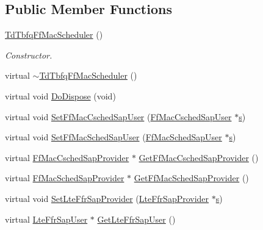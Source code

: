 \subsection*{Public Member Functions}
\begin{DoxyCompactItemize}
\item 
\hyperlink{classns3_1_1TdTbfqFfMacScheduler_ae3122288024d362f6257689e8f1cb55f}{Td\+Tbfq\+Ff\+Mac\+Scheduler} ()
\begin{DoxyCompactList}\small\item\em Constructor. \end{DoxyCompactList}\item 
virtual \hyperlink{classns3_1_1TdTbfqFfMacScheduler_ad0af9fb4be53e098cc3f7ee81c39d1d4}{$\sim$\+Td\+Tbfq\+Ff\+Mac\+Scheduler} ()
\item 
virtual void \hyperlink{classns3_1_1TdTbfqFfMacScheduler_a2e3ba63463ee06a7fca95def5363be8b}{Do\+Dispose} (void)
\item 
virtual void \hyperlink{classns3_1_1TdTbfqFfMacScheduler_a3bffc6c77357e4f27ae1e991e82c3d85}{Set\+Ff\+Mac\+Csched\+Sap\+User} (\hyperlink{classns3_1_1FfMacCschedSapUser}{Ff\+Mac\+Csched\+Sap\+User} $\ast$\hyperlink{generate__test__data__lte__sinr_8m_ad83eeb3a142285d1243a08c6b7026df8}{s})
\item 
virtual void \hyperlink{classns3_1_1TdTbfqFfMacScheduler_ab65051b5985639a76336f8d872fb9e8b}{Set\+Ff\+Mac\+Sched\+Sap\+User} (\hyperlink{classns3_1_1FfMacSchedSapUser}{Ff\+Mac\+Sched\+Sap\+User} $\ast$\hyperlink{generate__test__data__lte__sinr_8m_ad83eeb3a142285d1243a08c6b7026df8}{s})
\item 
virtual \hyperlink{classns3_1_1FfMacCschedSapProvider}{Ff\+Mac\+Csched\+Sap\+Provider} $\ast$ \hyperlink{classns3_1_1TdTbfqFfMacScheduler_a4425e28389e1a305032d993becc78fbc}{Get\+Ff\+Mac\+Csched\+Sap\+Provider} ()
\item 
virtual \hyperlink{classns3_1_1FfMacSchedSapProvider}{Ff\+Mac\+Sched\+Sap\+Provider} $\ast$ \hyperlink{classns3_1_1TdTbfqFfMacScheduler_a2c2c112ceb89d90e6aecedd2c2a72884}{Get\+Ff\+Mac\+Sched\+Sap\+Provider} ()
\item 
virtual void \hyperlink{classns3_1_1TdTbfqFfMacScheduler_ace0852121c7719227fd6f6daf2a175bd}{Set\+Lte\+Ffr\+Sap\+Provider} (\hyperlink{classns3_1_1LteFfrSapProvider}{Lte\+Ffr\+Sap\+Provider} $\ast$\hyperlink{generate__test__data__lte__sinr_8m_ad83eeb3a142285d1243a08c6b7026df8}{s})
\item 
virtual \hyperlink{classns3_1_1LteFfrSapUser}{Lte\+Ffr\+Sap\+User} $\ast$ \hyperlink{classns3_1_1TdTbfqFfMacScheduler_aca135b6386627e6603991bee030f3b97}{Get\+Lte\+Ffr\+Sap\+User} ()

\end{DoxyCompactItemize}
